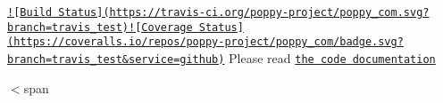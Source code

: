 \href{https://travis-ci.org/poppy-project/poppy_com}{\tt !\mbox{[}Build Status\mbox{]}(https\-://travis-\/ci.\-org/poppy-\/project/poppy\-\_\-com.\-svg?branch=travis\-\_\-test)}\href{https://coveralls.io/github/poppy-project/poppy_com?branch=travis_test}{\tt !\mbox{[}Coverage Status\mbox{]}(https\-://coveralls.\-io/repos/poppy-\/project/poppy\-\_\-com/badge.\-svg?branch=travis\-\_\-test\&service=github)} Please read \href{http://poppy-project.github.io/poppy_com/}{\tt the code documentation}

$<$span 